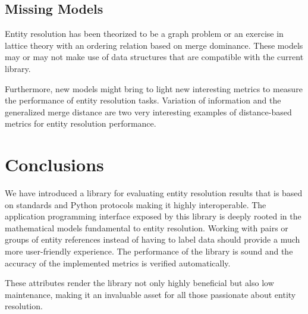 \documentclass[11pt]{article}
\begin{document}
    \subsection{Missing Models}

    Entity resolution has been theorized to be a graph problem\cite{eager2021}
    or an exercise in lattice theory with an ordering relation based on merge
    dominance\cite{Ben2009Swoosh}.
    These models may or may not make use of data structures that are compatible
    with the current library.

    Furthermore, new models might bring to light new interesting metrics to
    measure the performance of entity resolution tasks.
    Variation of information\cite{meila2007vi} and the generalized merge
    distance\cite{Men10} are two very interesting examples of distance-based
    metrics for entity resolution performance.

    \section{Conclusions}\label{sec:conclusions}

    We have introduced a library for evaluating entity resolution results that
    is based on standards and Python protocols making it highly interoperable.
    The application programming interface exposed by this library is deeply
    rooted in the mathematical models fundamental to entity resolution.
    Working with pairs or groups of entity references instead of having to label
    data should provide a much more user-friendly experience.
    The performance of the library is sound and the accuracy of the implemented
    metrics is verified automatically.

    These attributes render the library not only highly beneficial but also low
    maintenance, making it an invaluable asset for all those passionate about
    entity resolution.

    
\end{document}
